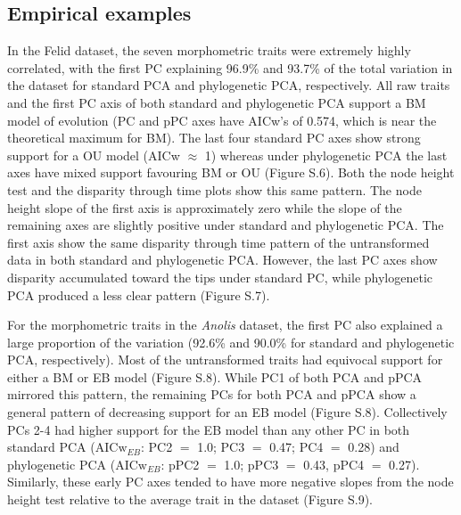 \documentclass[a4paper,11pt]{article}
\begin{document}
\subsection{Empirical examples}
In the Felid dataset, the seven morphometric traits were extremely highly correlated, with the first PC explaining 96.9\% and 93.7\% of the total variation in the dataset for standard PCA and phylogenetic PCA, respectively. All raw traits and the first PC axis of both standard and phylogenetic PCA support a BM model of evolution (PC and pPC axes have AICw's of 0.574, which is near the theoretical maximum for BM). The last four standard PC axes show strong support for a OU model (AICw $\approx$ 1) whereas under phylogenetic PCA the last axes have mixed support favouring BM or OU (Figure S.6). Both the node height test and the disparity through time plots show this same pattern. The node height slope of the first axis is approximately zero while the slope of the remaining axes are slightly positive under standard and phylogenetic PCA. The first axis show the same disparity through time pattern of the untransformed data in both standard and phylogenetic PCA. However, the last PC axes show disparity accumulated toward the tips under standard PC, while phylogenetic PCA produced a less clear pattern (Figure S.7).

For the morphometric traits in the \textit{Anolis} dataset, the first PC also explained a large proportion of the variation (92.6\% and 90.0\% for standard and phylogenetic PCA, respectively). Most of the untransformed traits had equivocal support for either a BM or EB model (Figure S.8). While PC1 of both PCA and pPCA mirrored this pattern, the remaining PCs for both PCA and pPCA show a general pattern of decreasing support for an EB model (Figure S.8). Collectively PCs 2-4 had higher support for the EB model than any other PC in both standard PCA ($\text{AICw}_{EB}$: PC2 $=$ 1.0; PC3 $=$ 0.47; PC4 $=$ 0.28) and phylogenetic PCA ($\text{AICw}_{EB}$: pPC2 $=$ 1.0; pPC3 $=$ 0.43, pPC4 $=$ 0.27).  Similarly, these early PC axes tended to have more negative slopes from the node height test relative to the average trait in the dataset (Figure S.9).
\end{document}
